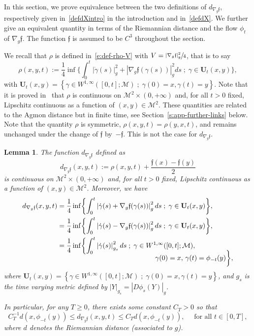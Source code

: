 \documentclass[10pt]{amsart}
\newcommand{\sep}{\;;\;}
\newtheorem{lemma}{Lemma}[section]
\theoremstyle{definition}
\newcommand{\M}{\ensuremath{\mathcal M}}
\newcommand{\f}{\ensuremath{\mathfrak{f}}}
\newcommand\nablag{\nabla_{g}}
\begin{document}
In this section, we prove equivalence between the two definitions of $d_{\nablag \f}$, respectively given in~\eqref{defdXintro} in the introduction and in~\eqref{defdX}.
We further give an equivalent quantity in terms of the Riemannian distance and the flow $\phi_t$ of $\nablag\f$. The function $\f$ is assumed to be $C^{3}$ throughout the section.

We recall that $\rho$ is defined in~\eqref{e:def-rho-V} with $V= \sfrac{|\nabla_g \f|_g^2}{4}$, that is to say
\begin{equation}
\label{e:def-rho}
\rho(x,y,t):=\frac{1}{4} \inf \biggl\{ \int_0^t |\dot{\gamma}(s)|_g^2 +|\nabla_g\f(\gamma(s))|_g^2 ds\sep \gamma \in \mathbf{U}_t(x,y) \biggr\},
\end{equation}
with $\mathbf{U}_t(x,y)= \left\{ \gamma \in W^{1,\infty} ([0,t] ; \M )\sep\gamma(0)=x, \gamma(t)= y \right\}$.
Note that it is proved in~\cite[App.]{LY86} that $\rho$ is continuous on $\M^2 \times (0,+\infty)$ and, for all $t>0$ fixed, Lipschitz continuous as a function of $(x,y)\in \M^2$.
These quantities are related to the Agmon distance but in finite time, see Section~\ref{s:app-further-links} below. Note that the quantity $\rho$ is symmetric, $\rho(x,y,t) = \rho(y,x,t)$, and remains unchanged under the change of $\f$ by~$-\f$.
This is not the case for $d_{\nablag \f}$.

\begin{lemma}
\label{lmdist}
The function $d_{\nablag \f}$ defined as
\begin{equation}
\label{e:def-dX}
d_{\nablag \f}(x,y,t) := \rho(x,y,t)+\frac{\f(x)-\f(y)}{2}
\end{equation}
is continuous on $\M^2 \times (0,+\infty)$ and, for all $t>0$ fixed, Lipschitz continuous as a function of $(x,y)\in \M^2$. Moreover, we have
\begin{align}
\label{e:equiv-def-dx}
d_{\nablag \f}(x,y,t)&=\frac{1}{4} \inf \biggl\{ \int_0^t \left|\dot{\gamma}(s)+\nablag\f(\gamma(s))\right|_g^{2} ds\sep \gamma \in \mathbf{U}_t(x,y) \biggr\}, \\
\label{defdXappend}&=\frac{1}{4} \inf \biggl\{ \int_0^t \left|\dot{\gamma}(s)-\nablag\f(\gamma(s))\right|_g^{2} ds\sep \gamma \in \mathbf{U}_t(x,y) \biggr\},\\
\label{defdXbisappend}&=\frac{1}{4} \inf \biggl\{ \int_0^t \left|\dot{\gamma}(s)\right|_{g_s}^{2} ds\sep \gamma \in W^{1,\infty} ([0,t] ; \M ),\\[-10pt]
&\hspace*{5cm}\gamma(0)=x,\,\gamma(t)= \phi_{-t}(y) \biggr\},\notag
\end{align}
where $\mathbf{U}_t(x,y)= \left\{ \gamma \in W^{1,\infty} ([0,t] ; \M )\sep\gamma(0)=x, \gamma(t)= y \right\}$, and
$g_s$ is the time varying metric defined by $ \left|Y\right|_{g_s}= \left|D\phi_s(Y)\right|_{g}$.

In particular, for any $T\geq 0$, there exists some constant $C_T>0$ so that
\[
C_T^{-1}d(x,\phi_{-t}(y))\leq d_{\nablag \f}(x,y,t)\leq C_T d(x,\phi_{-t}(y)), \quad \text{ for all } t\in [0,T],
\]
where $d$ denotes the Riemannian distance (associated to $g$).
\end{lemma}
\end{document}
